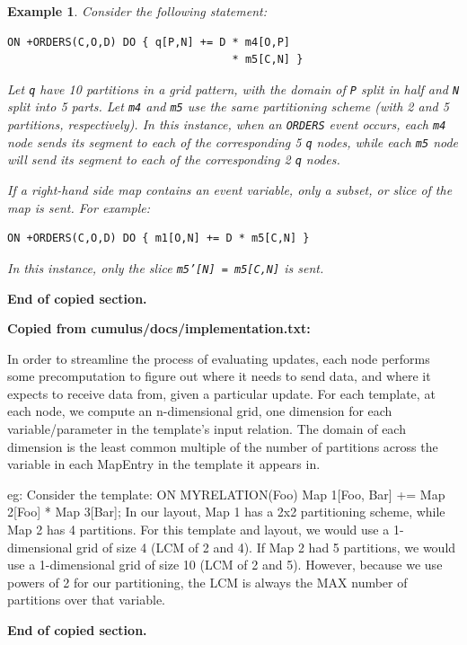 \documentclass{sig-semester}
\newtheorem{example}[theorem]{Example}
\begin{document}
\begin{example}
Consider the following statement:
\begin{verbatim}
ON +ORDERS(C,O,D) DO { q[P,N] += D * m4[O,P] 
                                   * m5[C,N] }
\end{verbatim}

Let \texttt{q} have 10 partitions in a grid pattern, with the domain of \texttt{P} split in half and \texttt{N} split into 5 parts.  Let \texttt{m4} and \texttt{m5} use the same partitioning scheme (with 2 and 5 partitions, respectively). In this instance, when an \texttt{ORDERS} event occurs, each \texttt{m4} node sends its segment to each of the corresponding 5 \texttt{q} nodes, while each \texttt{m5} node will send its segment to each of the corresponding 2 \texttt{q} nodes. 

If a right-hand side map contains an event variable, only a subset, or slice of the map is sent.  For example:
\begin{verbatim}
ON +ORDERS(C,O,D) DO { m1[O,N] += D * m5[C,N] }
\end{verbatim}
In this instance, only the slice \texttt{m5'[N] = m5[C,N]} is sent.
\end{example}

\textbf{End of copied section.}

\textbf{Copied from cumulus/docs/implementation.txt:}

In order to streamline the process of evaluating updates, each node performs some precomputation to figure out where it needs to send data, and where it expects to receive data from, given a particular update.  For each template, at each node, we compute an n-dimensional grid, one dimension for each variable/parameter in the template's input relation.  The domain of each dimension is the least common multiple of the number of partitions across the variable in each MapEntry in the template it appears in.

  eg: Consider the template: ON MYRELATION(Foo) Map 1[Foo, Bar] += Map 2[Foo] * Map 3[Bar];
  In our layout, Map 1 has a 2x2 partitioning scheme, while Map 2 has 4 partitions.  For this template and 
  layout, we would use a 1-dimensional grid of size 4 (LCM of 2 and 4).  If Map 2 had 5 partitions, we would 
  use a 1-dimensional grid of size 10 (LCM of 2 and 5).  However, because we use powers of 2 for our 
  partitioning, the LCM is always the MAX number of partitions over that variable.

\textbf{End of copied section. }
\end{document}
